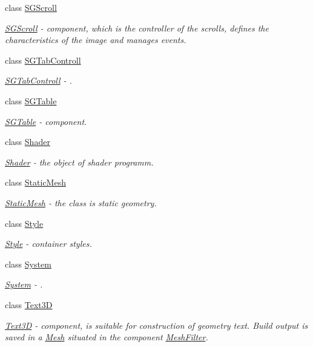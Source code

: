 \begin{DoxyCompactItemize}
class \hyperlink{classcsad_1_1_s_g_scroll}{S\-G\-Scroll}
\begin{DoxyCompactList}\small\item\em \hyperlink{classcsad_1_1_s_g_scroll}{S\-G\-Scroll} -\/ component, which is the controller of the scrolls, defines the characteristics of the image and manages events. \end{DoxyCompactList}\item 
class \hyperlink{classcsad_1_1_s_g_tab_controll}{S\-G\-Tab\-Controll}
\begin{DoxyCompactList}\small\item\em \hyperlink{classcsad_1_1_s_g_tab_controll}{S\-G\-Tab\-Controll} -\/ . \end{DoxyCompactList}\item 
class \hyperlink{classcsad_1_1_s_g_table}{S\-G\-Table}
\begin{DoxyCompactList}\small\item\em \hyperlink{classcsad_1_1_s_g_table}{S\-G\-Table} -\/ component. \end{DoxyCompactList}\item 
class \hyperlink{classcsad_1_1_shader}{Shader}
\begin{DoxyCompactList}\small\item\em \hyperlink{classcsad_1_1_shader}{Shader} -\/ the object of shader programm. \end{DoxyCompactList}\item 
class \hyperlink{classcsad_1_1_static_mesh}{Static\-Mesh}
\begin{DoxyCompactList}\small\item\em \hyperlink{classcsad_1_1_static_mesh}{Static\-Mesh} -\/ the class is static geometry. \end{DoxyCompactList}\item 
class \hyperlink{classcsad_1_1_style}{Style}
\begin{DoxyCompactList}\small\item\em \hyperlink{classcsad_1_1_style}{Style} -\/ container styles. \end{DoxyCompactList}\item 
class \hyperlink{classcsad_1_1_system}{System}
\begin{DoxyCompactList}\small\item\em \hyperlink{classcsad_1_1_system}{System} -\/ . \end{DoxyCompactList}\item 
class \hyperlink{classcsad_1_1_text3_d}{Text3\-D}
\begin{DoxyCompactList}\small\item\em \hyperlink{classcsad_1_1_text3_d}{Text3\-D} -\/ component, is suitable for construction of geometry text. Build output is saved in a \hyperlink{classcsad_1_1_mesh}{Mesh} situated in the component \hyperlink{classcsad_1_1_mesh_filter}{Mesh\-Filter}. \end{DoxyCompactList}\item 

\end{DoxyCompactItemize}
